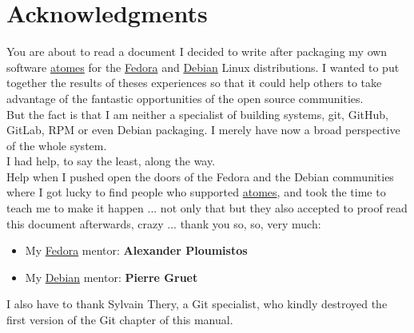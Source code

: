 \chapter*{Acknowledgments}

You are about to read a document I decided to write after packaging my own software \href{https://atomes.ipcms.fr}{atomes} for the \href{https://fedoraproject.org}{Fedora} and \href{https://www.debian.org}{Debian} Linux distributions. 
I wanted to put together the results of theses experiences so that it could help others to take advantage of the fantastic opportunities of the open source communities. \\[0.25cm]
But the fact is that I am neither a specialist of building systems, git, GitHub, GitLab, RPM or even Debian packaging. 
I merely have now a broad perspective of the whole system. \\[0.25cm]
I had help, to say the least, along the way. \\[0.25cm]
Help when I pushed open the doors of the Fedora and the Debian communities where I got lucky to find people who supported \href{https://atomes.ipcms.fr}{atomes}, 
and took the time to teach me to make it happen ... not only that but they also accepted to proof read this document afterwards, crazy ... thank you so, so, very much: 
\begin{itemize}
\item My \href{https://fedoraproject.org}{Fedora} mentor: {\bf{Alexander Ploumistos}}
\item My \href{https://www.debian.org}{Debian} mentor: {\bf{Pierre Gruet}}
\end{itemize}
I also have to thank Sylvain Thery, a Git specialist, who kindly destroyed the first version of the Git chapter of this manual. 

